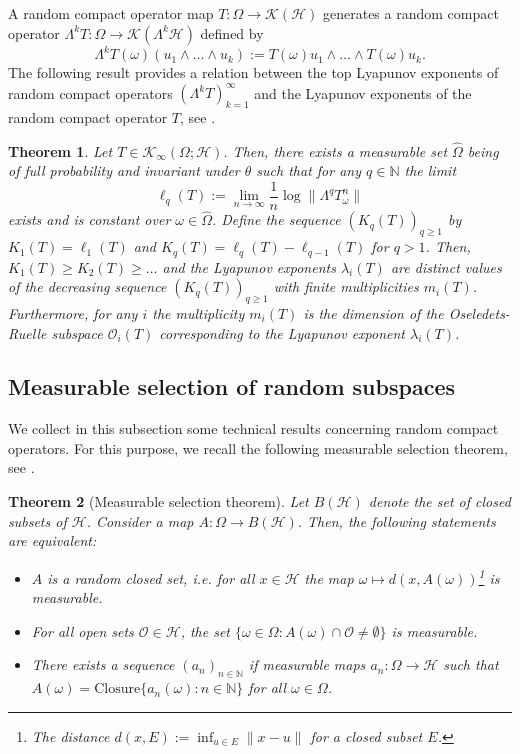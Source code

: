 \documentclass[pdflatex,sn-mathphys-num]{sn-jnl}%
\theoremstyle{thmstyleone}%
\newtheorem{theorem}{Theorem}%
\theoremstyle{thmstyletwo}%
\theoremstyle{thmstylethree}%
\newcommand{\N}{\mathbb{N}}
\newcommand{\cH}{\mathcal{H}}
\newcommand{\cK}{\mathcal{K}}
\newcommand{\cO}{\mathcal{O}}
\numberwithin{equation}{section}
\begin{document}
A random compact operator map $T:\Omega\rightarrow \cK(\cH)$ generates a random compact operator  $\Lambda^k T:\Omega\rightarrow \cK(\Lambda^k\cH)$ defined by
\[
\Lambda^kT(\omega)(u_1\wedge\dots\wedge u_k):= T(\omega)u_1\wedge\dots\wedge T(\omega)u_k.
\]
%
The following result provides a relation between the top Lyapunov exponents of random compact operators $(\Lambda^kT)_{k=1}^{\infty}$ and the Lyapunov exponents of the random compact operator $T$, see \cite[Theorem 1.3]{Blumenthal16}.
%
\begin{theorem}\label{Connection}
 Let $T\in \mathcal K_{\infty}(\Omega;\mathcal H)$. Then, there exists a measurable set $
	\widehat \Omega$ being of full probability and invariant under $\theta$ such that for any $q\in \N$ the limit 
	\[
	\ell_q(T):=\lim_{n\to\infty}\frac{1}{n}\log\|\Lambda^qT^n_{\omega}\|
	\]
exists and is constant over $\omega\in\widehat\Omega$. Define the sequence $(K_q(T))_{q\geq 1}$ by $K_1(T)=\ell_1(T)$ and $K_q(T)=\ell_q(T)-\ell_{q-1}(T)$ for $q>1$. Then, $K_1(T)\geq K_2(T)\geq \dots$ and the Lyapunov exponents $\lambda_i(T)$ are distinct values of the decreasing  sequence $(K_q(T))_{q\geq 1}$ with finite multiplicities $m_i(T)$. Furthermore, for any $i$ the multiplicity $m_i(T)$ is the dimension of the Oseledets-Ruelle subspace $\mathcal O_i(T)$ corresponding to the Lyapunov exponent $\lambda_i(T)$.
\end{theorem}
%
%
%
\subsection{Measurable selection of random subspaces}
We collect in this subsection some technical results concerning random compact operators. For this purpose, we recall the following measurable selection theorem, see \cite[Theorem 4.2]{Wagner1977}.
%
%
%
%
%
\begin{theorem}[Measurable selection theorem]\label{Measurableselectiontheorem}
Let $B(\cH)$ denote the set of closed subsets of $\cH$. Consider a map $A:\Omega\rightarrow B(\cH)$. Then, the following statements are equivalent:
\begin{itemize}
    \item [(i)] $A$ is a random closed set, i.e. for all $x\in\cH$ the map $\omega\mapsto d(x,A(\omega))$\footnote{The distance $d(x,E):=\inf_{u\in E}\|x-u\|$ for a closed subset $E$.} is measurable.
    \item [(ii)] For all open sets $\cO\in\cH$, the set $\{\omega\in\Omega: A(\omega)\cap \cO\not=\emptyset\}$ is measurable.
    \item [(iii)] There exists a sequence $(a_n)_{n\in \N}$ if measurable maps $a_n:\Omega\rightarrow \cH$ such that $A(\omega)=\mbox{Closure}\{a_n(\omega): n\in\N\}$ for all $\omega\in\Omega$.
\end{itemize}

\end{theorem}
\end{document}
